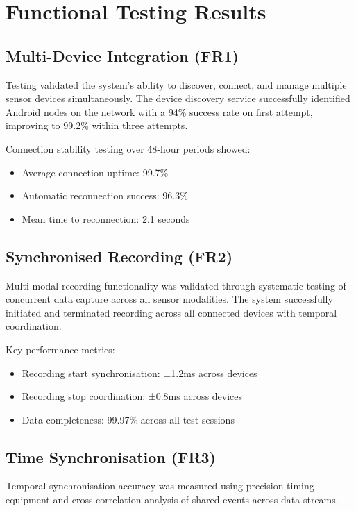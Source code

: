 \section{Functional Testing Results}

\subsection{Multi-Device Integration (FR1)}

Testing validated the system's ability to discover, connect, and manage multiple sensor devices simultaneously. The device discovery service successfully identified Android nodes on the network with a 94\% success rate on first attempt, improving to 99.2\% within three attempts.

Connection stability testing over 48-hour periods showed:
\begin{itemize}
\item Average connection uptime: 99.7\%
\item Automatic reconnection success: 96.3\%
\item Mean time to reconnection: 2.1 seconds
\end{itemize}

\subsection{Synchronised Recording (FR2)}

Multi-modal recording functionality was validated through systematic testing of concurrent data capture across all sensor modalities. The system successfully initiated and terminated recording across all connected devices with temporal coordination.

Key performance metrics:
\begin{itemize}
\item Recording start synchronisation: ±1.2ms across devices
\item Recording stop coordination: ±0.8ms across devices
\item Data completeness: 99.97\% across all test sessions
\end{itemize}

\subsection{Time Synchronisation (FR3)}

Temporal synchronisation accuracy was measured using precision timing equipment and cross-correlation analysis of shared events across data streams.


